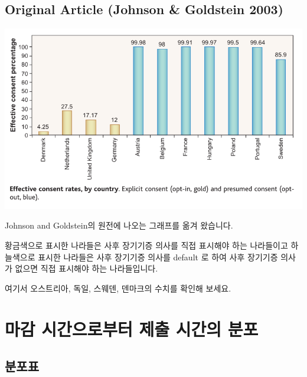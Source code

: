 \documentclass[
]{book}
\begin{document}
\subsection{Original Article (Johnson \& Goldstein 2003)}\label{original-article-johnson-goldstein-2003}

\begin{flushleft}\includegraphics[width=0.5\linewidth]{./pics/default_effects_by_country} \end{flushleft}

Johnson and Goldstein의 원전에 나오는 그래프를 옮겨 왔습니다.

황금색으로 표시한 나라들은 사후 장기기증 의사를 직접 표시해야 하는 나라들이고 하늘색으로 표시한 나라들은 사후 장기기증 의사를 default 로 하여 사후 장기기증 의사가 없으면 직접 표시해야 하는 나라들입니다.

여기서 오스트리아, 독일, 스웨덴, 덴마크의 수치를 확인해 보세요.

\section{마감 시간으로부터 제출 시간의 분포}\label{uxb9c8uxac10-uxc2dcuxac04uxc73cuxb85cuxbd80uxd130-uxc81cuxcd9c-uxc2dcuxac04uxc758-uxbd84uxd3ec-11}

\subsection{분포표}\label{uxbd84uxd3ecuxd45c-12}
\end{document}
